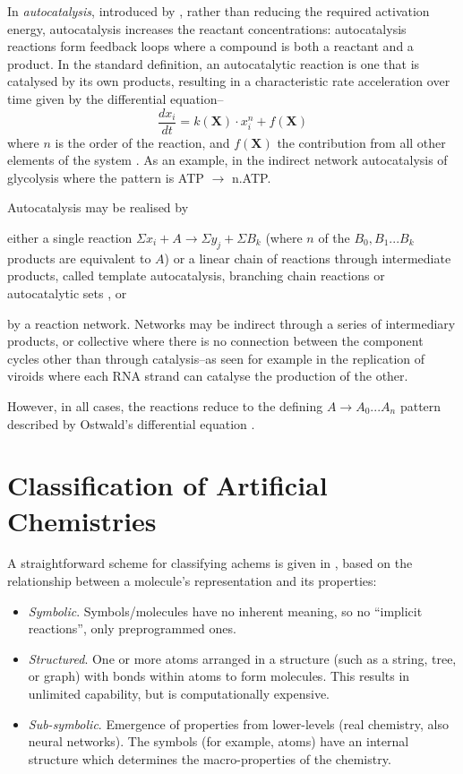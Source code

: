 In \emph{autocatalysis}, introduced by \textcite{Ostwald1890}, rather than reducing the required activation
energy, autocatalysis increases the reactant concentrations: autocatalysis reactions form feedback loops where a compound is both a
reactant and a product. In the standard definition, an autocatalytic reaction is one that is catalysed by its own products, resulting in a
characteristic rate acceleration over time given by the differential equation--
\[\frac{dx_i}{dt} = k(\mathbf{X}) \cdot x^n_i + f(\mathbf{X})\] where $n$ is the order of the reaction, and $f(\mathbf{X})$ the contribution from all other elements of the system \parencite{Plasson2010}. As an example, in the indirect network autocatalysis of glycolysis where the pattern is ATP \(\rightarrow\) n.ATP.

Autocatalysis may be realised by \begin{inparaenum}
	\item either a single reaction \eg$\Sigma x_i + A\rightarrow \Sigma y_j + \Sigma B_k$ (where $n$ of the ${B_0, B_1...B_k}$ products are equivalent to $A$) or a linear chain of reactions through intermediate products, called template autocatalysis, branching chain reactions or autocatalytic sets \parencite{King1978}, or
	\item by a reaction network. Networks may be indirect through a series of intermediary products, or collective where there is no connection between the component cycles other than through catalysis--as seen for example in the replication of viroids where each RNA strand can catalyse the production of the other.
\end{inparaenum}

However, in all cases, the reactions reduce to the defining $A \rightarrow A_0...A_n$ pattern described by Ostwald's differential equation \parencite{Plasson2010}.

\section{Classification of Artificial Chemistries}\label{classification-of-artificial-chemistries}

A straightforward scheme for classifying \glspl{achem} is given in \textcite{Faulconbridge2011}, based on the relationship between a molecule's representation and its properties:

\begin{itemize}
	\item \emph{Symbolic}. Symbols/molecules have no inherent meaning, so no ``implicit reactions'', only preprogrammed ones.	
	\item \emph{Structured}. One or more atoms arranged in a structure (such as a string, tree, or graph) with bonds within atoms to form molecules. This results in unlimited capability, but is computationally expensive.	
	\item \emph{Sub-symbolic}. Emergence of properties from lower-levels (\eg real chemistry, also neural networks). The symbols (for example, atoms) have an internal structure which determines the macro-properties of the chemistry.
\end{itemize}

